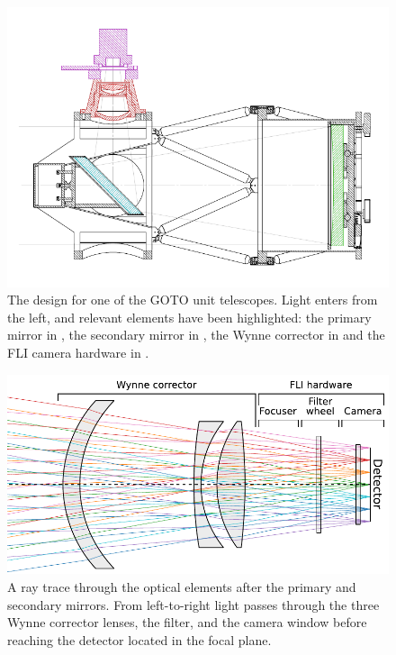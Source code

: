 \begin{colsection}
\begin{figure}[p]
    \begin{center}
        \includegraphics[width=0.7\linewidth]{images/throughput/OTA_optics.png}
    \end{center}
    \caption[GOTO optical telescope assembly]{
        The  design for one of the GOTO unit telescopes. Light enters from the left, and relevant elements have been highlighted: the primary mirror in , the secondary mirror in , the Wynne corrector in  and the FLI camera hardware in .
    }\label{fig:ota}
\end{figure}

\begin{figure}[p]
    \begin{center}
        \includegraphics[width=0.7\linewidth]{images/throughput/wynne.pdf}
    \end{center}
    \caption[Ray tracing the corrector elements]{
        A ray trace through the optical elements after the primary and secondary mirrors. From left-to-right light passes through the three Wynne corrector lenses, the filter, and the camera window before reaching the detector located in the focal plane.
    }\label{fig:wynne}
\end{figure}

\clearpage


\end{colsection}
